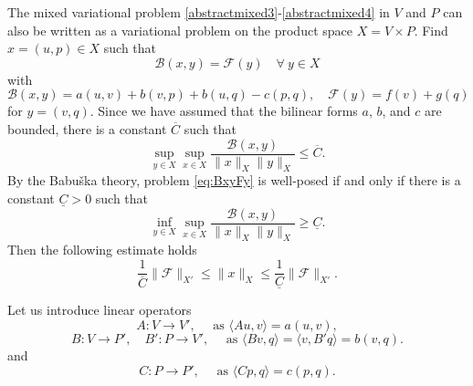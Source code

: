 The mixed variational problem \eqref{abstractmixed3}-\eqref{abstractmixed4} in $V$ and $P$ can also be written as a variational problem on the product space $X=V\times P$. Find $x=(u,p)\in X$ such that
\begin{equation}\label{eq:BxyFy}
\mathcal B(x, y) =\mathcal F(y) \quad\forall~y\in X
\end{equation}
with
\[
\mathcal B(x, y)=a(u,v)+b(v,p)+b(u,q)-c(p,q) ,\quad\mathcal F(y)=f(v)+g(q)
\]
for $y=(v,q)$.
Since we have assumed that the bilinear forms $a$, $b$, and $c$ are bounded, there is a
constant $\overline{C}$ such that
\begin{equation}\label{eq:Bsupsup}
\sup_{y\in X}\sup_{x\in X}\frac{\mathcal B(x, y)}{\|x\|_X\|y\|_X}\leq \overline{C}.
\end{equation}
By the Babu\v{s}ka theory, problem \eqref{eq:BxyFy} is well-posed if and only if there is a constant $\underline{C}>0$ such that
\begin{equation}\label{eq:Binfsup}
\inf_{y\in X}\sup_{x\in X}\frac{\mathcal B(x, y)}{\|x\|_X\|y\|_X}\geq \underline{C}.
\end{equation}
Then the following estimate holds
\[
\frac{1}{\overline{C}}\|\mathcal F\|_{X'}\leq \|x\|_X\leq \frac{1}{\underline{C}}\|\mathcal F\|_{X'}.
\]

Let us introduce linear operators
\[
A : V \to V',\quad \textrm{ as } \langle Au, v\rangle = a(u, v),
\]
\[
B: V\to P', \quad B' : P \to V',\quad \textrm{ as } \langle Bv, q\rangle = \langle v, B'q\rangle = b(v, q).
\]
and
\[
C : P \to P',\quad \textrm{ as } \langle Cp, q\rangle = c(p, q).
\]

